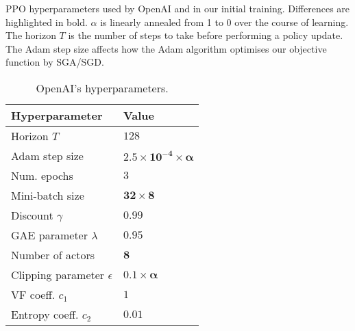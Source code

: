 \documentclass[12pt,a4paper]{article}
\begin{document}
\begin{table}[ht]
    \caption{PPO hyperparameters used by OpenAI and in our initial training. Differences are highlighted in bold. $\alpha$ is linearly annealed from 1 to 0 over the course of learning. The horizon $T$ is the number of steps to take before performing a policy update. The Adam step size affects how the Adam algorithm optimises our objective function by SGA/SGD.}
    \label{tab:temps}
    \begin{subtable}[ht]{0.45\textwidth}
        \centering
        \caption{OpenAI's hyperparameters.}
        \label{tab:openai-param}    
        \begin{tabular}{ l|l } 
            Hyperparameter                & Value \\
            \hline 
            Horizon $T$                   & $128$ \\ 
            Adam step size                 & $\mathbf{2.5 \times 10^{-4} \times \alpha}$ \\
            Num. epochs                   & $3$ \\
            Mini-batch size                & $\mathbf{32 \times 8}$ \\
            Discount $\gamma$           & $0.99$ \\
            GAE parameter $\lambda$     & $0.95$ \\
            Number of actors              & $\mathbf{8}$ \\
            Clipping parameter $\epsilon$ & $\mathbf{0.1 \times \alpha}$ \\
            VF coeff. $c_1$               & $1$ \\
            Entropy coeff. $c_2$          & $\mathbf{0.01}$
        \end{tabular}
       

\end{subtable}
\end{table}
\end{document}
